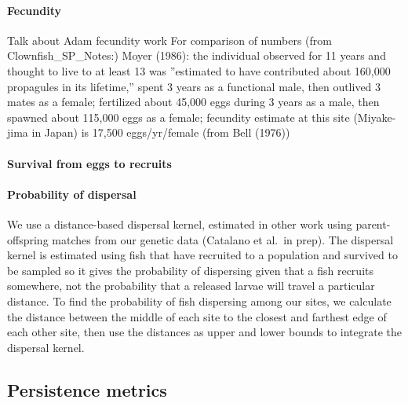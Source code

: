 \documentclass[12pt, oneside]{article}   	%
\begin{document}

\paragraph*{Fecundity}
Talk about Adam fecundity work
For comparison of numbers (from Clownfish\_SP\_Notes:) Moyer (1986): the individual observed for 11 years and thought to live to at least 13 was ”estimated to have contributed about 160,000 propagules in its lifetime,” spent 3 years as a functional male, then outlived 3 mates as a female; fertilized about 45,000 eggs during 3 years as a male, then spawned about 115,000 eggs as a female; fecundity estimate at this site (Miyake-jima in Japan) is 17,500 eggs/yr/female (from Bell (1976))

\paragraph*{Survival from eggs to recruits}



\paragraph*{Probability of dispersal}

We use a distance-based dispersal kernel, estimated in other work using parent-offspring matches from our genetic data (Catalano et al.\ in prep). The dispersal kernel is estimated using fish that have recruited to a population and survived to be sampled so it gives the probability of dispersing given that a fish recruits somewhere, not the probability that a released larvae will travel a particular distance. 
To find the probability of fish dispersing among our sites, we calculate the distance between the middle of each site to the closest and farthest edge of each other site, then use the distances as upper and lower bounds to integrate the dispersal kernel.


\subsection*{Persistence metrics}

\end{document}
